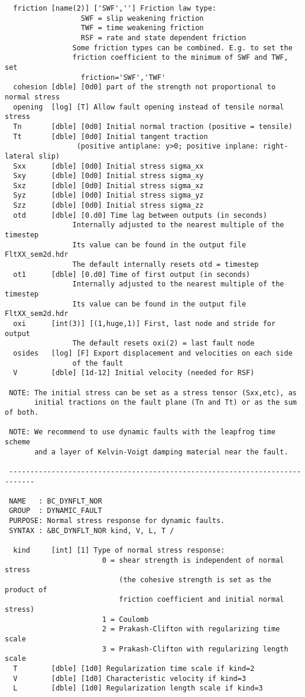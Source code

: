 \begin{verbatim}
  friction [name(2)] ['SWF',''] Friction law type:
                  SWF = slip weakening friction
                  TWF = time weakening friction
                  RSF = rate and state dependent friction
                Some friction types can be combined. E.g. to set the 
                friction coefficient to the minimum of SWF and TWF, set 
                  friction='SWF','TWF'
  cohesion [dble] [0d0] part of the strength not proportional to normal stress
  opening  [log] [T] Allow fault opening instead of tensile normal stress
  Tn       [dble] [0d0] Initial normal traction (positive = tensile)
  Tt       [dble] [0d0] Initial tangent traction 
                 (positive antiplane: y>0; positive inplane: right-lateral slip)
  Sxx      [dble] [0d0] Initial stress sigma_xx
  Sxy      [dble] [0d0] Initial stress sigma_xy
  Sxz      [dble] [0d0] Initial stress sigma_xz
  Syz      [dble] [0d0] Initial stress sigma_yz
  Szz      [dble] [0d0] Initial stress sigma_zz
  otd      [dble] [0.d0] Time lag between outputs (in seconds)
                Internally adjusted to the nearest multiple of the timestep
                Its value can be found in the output file FltXX_sem2d.hdr
                The default internally resets otd = timestep
  ot1      [dble] [0.d0] Time of first output (in seconds)
                Internally adjusted to the nearest multiple of the timestep
                Its value can be found in the output file FltXX_sem2d.hdr
  oxi      [int(3)] [(1,huge,1)] First, last node and stride for output
                The default resets oxi(2) = last fault node
  osides   [log] [F] Export displacement and velocities on each side
                of the fault
  V        [dble] [1d-12] Initial velocity (needed for RSF)

 NOTE: The initial stress can be set as a stress tensor (Sxx,etc), as
       initial tractions on the fault plane (Tn and Tt) or as the sum of both.

 NOTE: We recommend to use dynamic faults with the leapfrog time scheme
       and a layer of Kelvin-Voigt damping material near the fault.

 ----------------------------------------------------------------------------

 NAME   : BC_DYNFLT_NOR
 GROUP  : DYNAMIC_FAULT
 PURPOSE: Normal stress response for dynamic faults.
 SYNTAX : &BC_DYNFLT_NOR kind, V, L, T /

  kind     [int] [1] Type of normal stress response:
                       0 = shear strength is independent of normal stress
                           (the cohesive strength is set as the product of
                           friction coefficient and initial normal stress)
                       1 = Coulomb 
                       2 = Prakash-Clifton with regularizing time scale
                       3 = Prakash-Clifton with regularizing length scale
  T        [dble] [1d0] Regularization time scale if kind=2
  V        [dble] [1d0] Characteristic velocity if kind=3
  L        [dble] [1d0] Regularization length scale if kind=3


\end{verbatim}
